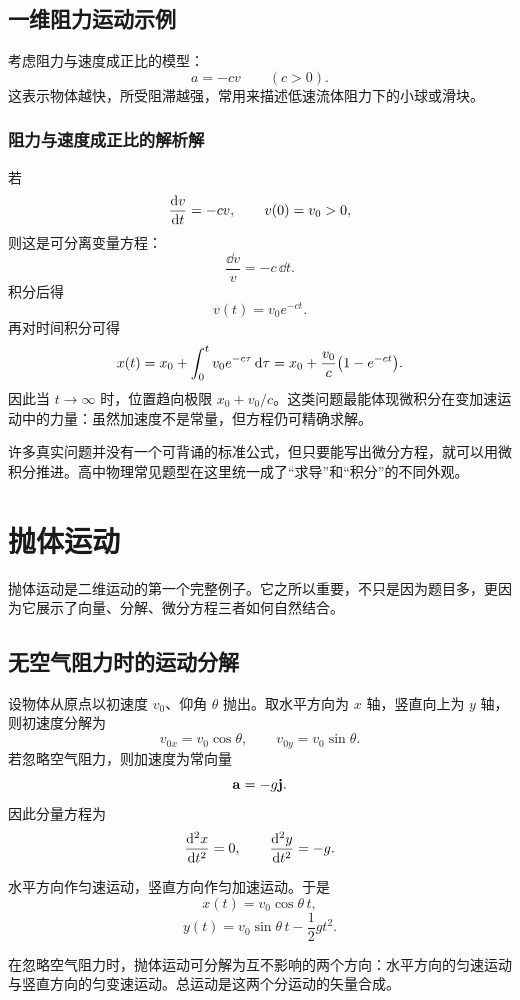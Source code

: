 \subsection{一维阻力运动示例}

考虑阻力与速度成正比的模型：
\[
 a=-cv \qquad (c>0).
\]
这表示物体越快，所受阻滞越强，常用来描述低速流体阻力下的小球或滑块。

\subsubsection*{阻力与速度成正比的解析解}
若
\[
\dv{v}{t}=-cv,
\qquad v(0)=v_0>0,
\]
则这是可分离变量方程：
\[
\frac{\dd v}{v}=-c\,\dd t.
\]
积分后得
\[
 v(t)=v_0 e^{-ct}.
\]
再对时间积分可得
\[
 x(t)=x_0+\int_0^t v_0 e^{-c\tau}\,\dd \tau
      =x_0+\frac{v_0}{c}\qty(1-e^{-ct}).
\]
因此当 $t\to\infty$ 时，位置趋向极限 $x_0+v_0/c$。这类问题最能体现微积分在变加速运动中的力量：虽然加速度不是常量，但方程仍可精确求解。

\begin{remark}
许多真实问题并没有一个可背诵的标准公式，但只要能写出微分方程，就可以用微积分推进。高中物理常见题型在这里统一成了``求导''和``积分''的不同外观。
\end{remark}

\section{抛体运动}

抛体运动是二维运动的第一个完整例子。它之所以重要，不只是因为题目多，更因为它展示了向量、分解、微分方程三者如何自然结合。

\subsection{无空气阻力时的运动分解}

设物体从原点以初速度 $v_0$、仰角 $\theta$ 抛出。取水平方向为 $x$ 轴，竖直向上为 $y$ 轴，则初速度分解为
\[
 v_{0x}=v_0\cos\theta,\qquad v_{0y}=v_0\sin\theta.
\]
若忽略空气阻力，则加速度为常向量
\[
\vb{a}=-g\vb{j}.
\]
因此分量方程为
\[
\dv[2]{x}{t}=0,\qquad \dv[2]{y}{t}=-g.
\]

水平方向作匀速运动，竖直方向作匀加速运动。于是
\[
 x(t)=v_0\cos\theta\, t,
\]
\[
 y(t)=v_0\sin\theta\, t-\frac12 gt^2.
\]

\begin{law}[平抛与斜抛的分运动独立性]
在忽略空气阻力时，抛体运动可分解为互不影响的两个方向：水平方向的匀速运动与竖直方向的匀变速运动。总运动是这两个分运动的矢量合成。
\end{law}

